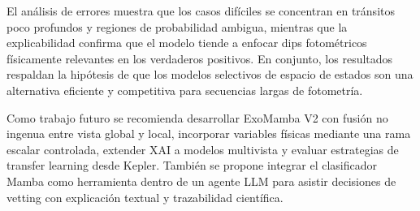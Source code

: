 \documentclass[conference]{IEEEtran}
\begin{document}
El análisis de errores muestra que los casos difíciles se concentran en tránsitos poco profundos y regiones de probabilidad ambigua, mientras que la explicabilidad confirma que el modelo tiende a enfocar dips fotométricos físicamente relevantes en los verdaderos positivos. En conjunto, los resultados respaldan la hipótesis de que los modelos selectivos de espacio de estados son una alternativa eficiente y competitiva para secuencias largas de fotometría.

Como trabajo futuro se recomienda desarrollar ExoMamba V2 con fusión no ingenua entre vista global y local, incorporar variables físicas mediante una rama escalar controlada, extender XAI a modelos multivista y evaluar estrategias de transfer learning desde Kepler. También se propone integrar el clasificador Mamba como herramienta dentro de un agente LLM para asistir decisiones de vetting con explicación textual y trazabilidad científica.

\balance
\end{document}
